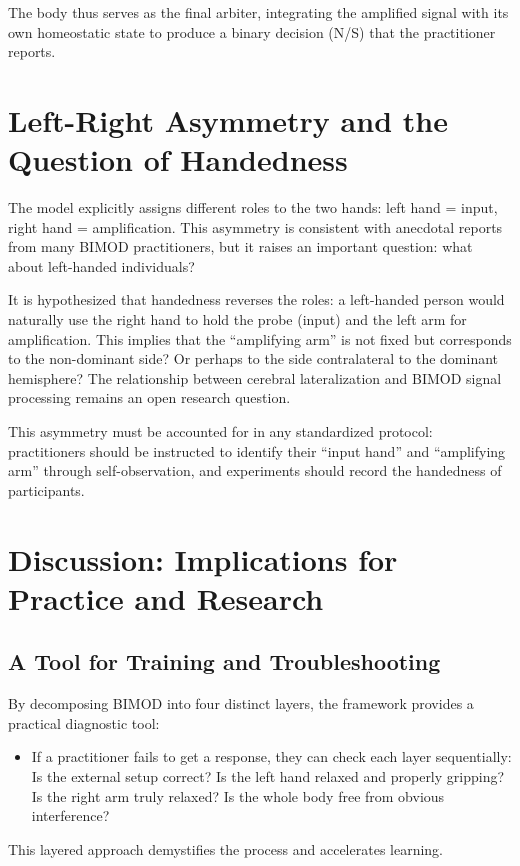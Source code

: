 \documentclass[12pt,a4paper]{article}
\begin{document}
The body thus serves as the final arbiter, integrating the amplified signal with its own homeostatic state to produce a binary decision (N/S) that the practitioner reports.

\section{Left-Right Asymmetry and the Question of Handedness}

The model explicitly assigns different roles to the two hands: left hand = input, right hand = amplification. This asymmetry is consistent with anecdotal reports from many BIMOD practitioners, but it raises an important question: what about left-handed individuals?

It is hypothesized that handedness reverses the roles: a left-handed person would naturally use the right hand to hold the probe (input) and the left arm for amplification. This implies that the ``amplifying arm'' is not fixed but corresponds to the non-dominant side? Or perhaps to the side contralateral to the dominant hemisphere? The relationship between cerebral lateralization and BIMOD signal processing remains an open research question.

This asymmetry must be accounted for in any standardized protocol: practitioners should be instructed to identify their ``input hand'' and ``amplifying arm'' through self-observation, and experiments should record the handedness of participants.

\section{Discussion: Implications for Practice and Research}

\subsection{A Tool for Training and Troubleshooting}

By decomposing BIMOD into four distinct layers, the framework provides a practical diagnostic tool:
\begin{itemize}
    \item If a practitioner fails to get a response, they can check each layer sequentially: Is the external setup correct? Is the left hand relaxed and properly gripping? Is the right arm truly relaxed? Is the whole body free from obvious interference?
\end{itemize}
This layered approach demystifies the process and accelerates learning.
\end{document}
